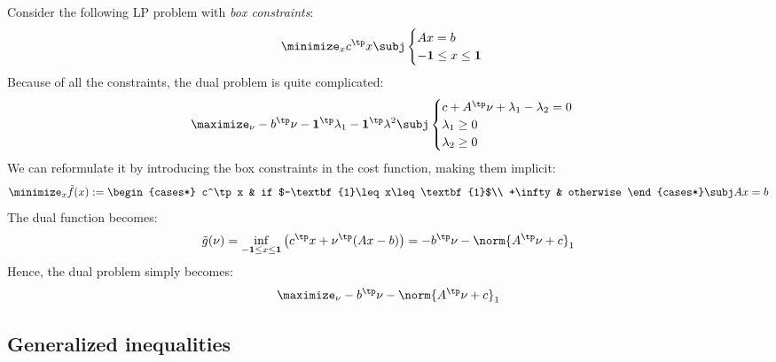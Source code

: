 \begin{example}
    Consider the following LP problem with \emph{box constraints}:
    \begin{equation*}
        \minimize_x c^\tp x \subj \begin{cases}
            Ax=b\\
            -\textbf{1}\leq x\leq\textbf{1}
        \end{cases}
    \end{equation*}
    Because of all the constraints, the dual problem is quite complicated:
    \begin{equation*}
        \maximize_\nu -b^\tp\nu-\textbf{1}^\tp\lambda_1-\textbf{1}^\tp\lambda^2 \subj \begin{cases}
            c+A^\tp\nu+\lambda_1-\lambda_2=0\\
            \lambda_1\geq0\\
            \lambda_2\geq0
        \end{cases}
    \end{equation*}
    We can reformulate it by introducing the box constraints in the cost function, making them implicit:
    \begin{equation*}
        \minimize_x \tilde{f}(x) := \begin{cases*}
            c^\tp x & if $-\textbf{1}\leq x\leq\textbf{1}$\\
            +\infty & otherwise
        \end{cases*}
        \subj Ax=b
    \end{equation*}
    The dual function becomes:
    \begin{equation*}
        \tilde{g}(\nu) = \inf_{-\textbf{1}\leq x\leq\textbf{1}} \left(c^\tp x+\nu^\tp(Ax-b)\right) = -b^\tp\nu-\norm{A^\tp\nu+c}_1
    \end{equation*}
    Hence, the dual problem simply becomes:
    \begin{equation*}
        \maximize_\nu -b^\tp\nu - \norm{A^\tp\nu+c}_1
    \end{equation*}
\end{example}

\subsection{Generalized inequalities}